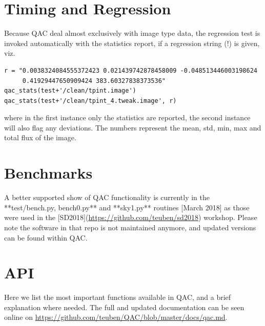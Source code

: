 \documentclass[11pt,twoside]{article}
\begin{document}
\section{Timing and Regression}

Because QAC deal almost exclusively with image type data, the regression test is invoked automatically
with the statistics report, if a regression string (!) is given, viz.

\footnotesize
\begin{verbatim}
r = "0.0038324084555372423 0.021439742878458009 -0.048513446003198624
     0.41929447650909424 383.60327838373536"
qac_stats(test+'/clean/tpint.image')
qac_stats(test+'/clean/tpint_4.tweak.image', r)
\end{verbatim}
\normalsize

where in the first instance only the statistics are reported, the second instance will also flag any deviations.
The numbers represent the mean, std, min, max and total flux of the image.

\section{Benchmarks}

A better supported show of QAC functionality is currently in the **test/bench.py, bench0.py** and **sky1.py** routines [March 2018]
as those were used in the
[SD2018](\url{https://github.com/teuben/sd2018}) workshop. Please note the software in that repo is not maintained anymore,
and updated versions can be found
within QAC.

\section{API}

Here we list the most important functions available in QAC, and a brief explanation where needed. The full and updated
documentation can be seen online on \url{https://github.com/teuben/QAC/blob/master/docs/qac.md}.
\end{document}
